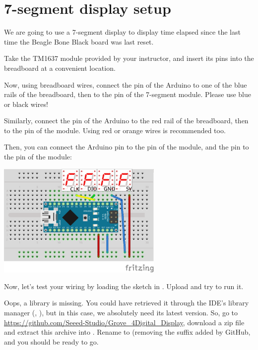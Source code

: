 \section{7-segment display setup}

We are going to use a 7-segment display to display time elapsed since
the last time the Beagle Bone Black board was last reset.

Take the TM1637 module provided by your instructor, and insert its pins
into the breadboard at a convenient location.

Now, using breadboard wires, connect the  pin of the Arduino to one
of the blue rails of the breadboard, then to the  pin of the 7-segment
module. Please use blue or black wires!

Similarly, connect the  pin of the Arduino to the red rail of
the breadboard, then to the  pin of the module. Using red or
orange wires is recommended too.

Then, you can connect the Arduino  pin to the  pin of
the module, and the  pin to the  pin of the module:

\begin{center}
\includegraphics[width=0.6\textwidth]{labs/boot-time-hardware-measurement/nano-7segment.png}
\end{center}

Now, let's test your wiring by loading the sketch in
. Upload and try to run it.

Oops, a library is missing. You could have retrieved it through the
IDE's library manager (, ), but in
this case, we absolutely need its latest version. So, go to
\url{https://github.com/Seeed-Studio/Grove_4Digital_Display},
download a zip file and extract this archive into
. Rename 
to  (removing the  suffix
added by GitHub, and you should be ready to go.

